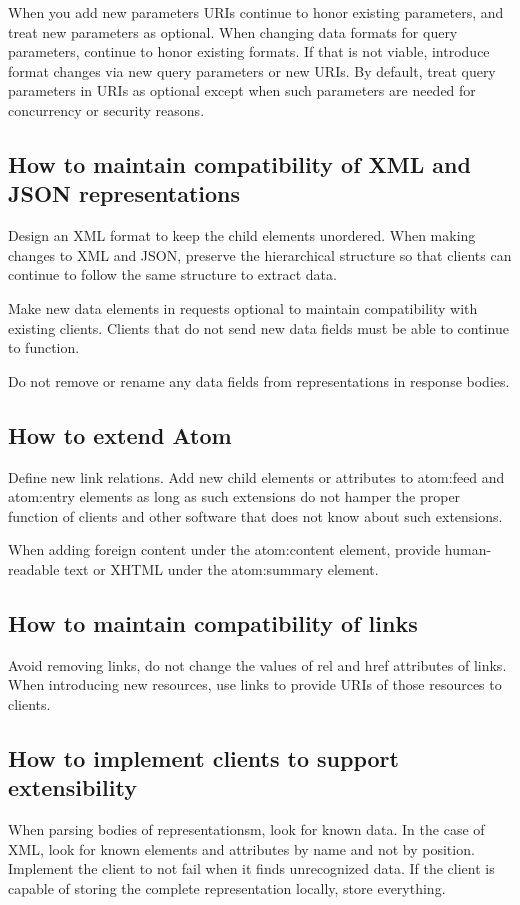 \documentclass[11pt,a4paper]{article}
\begin{document}
When you add new parameters URIs continue to honor existing parameters, and treat new parameters as optional. When changing data formats for query parameters, continue to honor existing formats. If that is not viable, introduce format changes via new query parameters or new URIs. By default, treat query parameters in URIs as optional except when such parameters are needed for concurrency or security reasons.

\subsection{How to maintain compatibility of XML and JSON representations}
Design an XML format to keep the child elements unordered. When making changes to XML and JSON, preserve the hierarchical structure so that clients can continue to follow the same structure to extract data.

Make new data elements in requests optional to maintain compatibility with existing clients. Clients that do not send new data fields must be able to continue to function.

Do not remove or rename any data fields from representations in response bodies.

\subsection{How to extend Atom}
Define new link relations. Add new child elements or attributes to atom:feed and atom:entry elements as long as such extensions do not hamper the proper function of clients and other software that does not know about such extensions.

When adding foreign content under the atom:content element, provide human-readable text or XHTML under the atom:summary element.

\subsection{How to maintain compatibility of links}
Avoid removing links, do not change the values of rel and href attributes of links. When introducing new resources, use links to provide URIs of those resources to clients.

\subsection{How to implement clients to support extensibility}
When parsing bodies of representationsm, look for known data. In the case of XML, look for known elements and attributes by name and not by position. Implement the client to not fail when it finds unrecognized data. If the client is capable of storing the complete representation locally, store everything.
\end{document}
